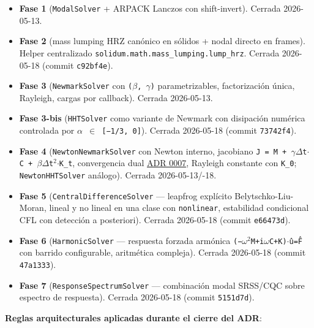 \documentclass[11pt,oneside]{report}
\begin{document}
\begin{itemize}
  \item \textbf{Fase 1} (\texttt{ModalSolver} + ARPACK Lanczos con shift-invert). Cerrada 2026-05-13.
  \item \textbf{Fase 2} (mass lumping HRZ canónico en sólidos + nodal directo en frames). Helper centralizado \texttt{solidum.\allowbreak{}math.\allowbreak{}mass\_\allowbreak{}lumping.\allowbreak{}lump\_\allowbreak{}hrz}. Cerrada 2026-05-18 (commit \texttt{c92bf4e}).
  \item \textbf{Fase 3} (\texttt{NewmarkSolver} con \texttt{(\ensuremath{\beta}, \ensuremath{\gamma})} parametrizables, factorización única, Rayleigh, cargas por callback). Cerrada 2026-05-13.
  \item \textbf{Fase 3-bis} (\texttt{HHTSolver} como variante de Newmark con disipación numérica controlada por \texttt{\ensuremath{\alpha} \ensuremath{\in} [−1/3, 0]}). Cerrada 2026-05-18 (commit \texttt{73742f4}).
  \item \textbf{Fase 4} (\texttt{NewtonNewmarkSolver} con Newton interno, jacobiano \texttt{J = M + \ensuremath{\gamma}\ensuremath{\Delta}t\ensuremath{\cdot}C + \ensuremath{\beta}\ensuremath{\Delta}t\ensuremath{^{2}}\ensuremath{\cdot}K\_\allowbreak{}t}, convergencia dual \hyperref[adr:0007]{ADR 0007}, Rayleigh constante con \texttt{K\_0}; \texttt{NewtonHHTSolver} análogo). Cerrada 2026-05-13/-18.
  \item \textbf{Fase 5} (\texttt{CentralDifferenceSolver} --- leapfrog explícito Belytschko-Liu-Moran, lineal y no lineal en una clase con \texttt{nonlinear}, estabilidad condicional CFL con detección a posteriori). Cerrada 2026-05-18 (commit \texttt{e66473d}).
  \item \textbf{Fase 6} (\texttt{HarmonicSolver} --- respuesta forzada armónica \texttt{(−\ensuremath{\omega}\ensuremath{^{2}}M+i\ensuremath{\omega}C+K)\ensuremath{\cdot}û=F̂} con barrido configurable, aritmética compleja). Cerrada 2026-05-18 (commit \texttt{47a1333}).
  \item \textbf{Fase 7} (\texttt{ResponseSpectrumSolver} --- combinación modal SRSS/CQC sobre espectro de respuesta). Cerrada 2026-05-18 (commit \texttt{5151d7d}).
\end{itemize}

\textbf{Reglas arquitecturales aplicadas durante el cierre del ADR}:
\end{document}
